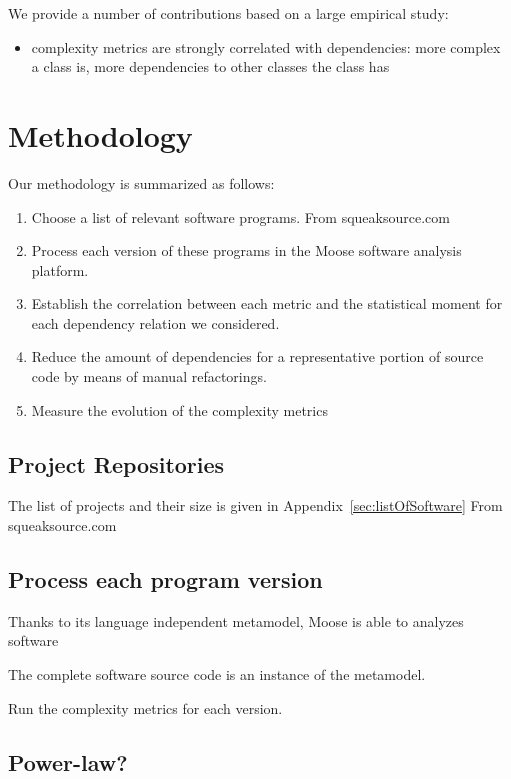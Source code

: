 \documentclass{sig-alternate}
\newcommand{\seclabel}[1]{\label{sec:#1}}
\newcommand{\appref}[1]{Appendix~\ref{sec:#1}}
\begin{document}
We provide a number of contributions based on a large empirical study:
\begin{itemize}
\item complexity metrics are strongly correlated with dependencies: more complex a class is, more dependencies to other classes the class has
\end{itemize}


\section{Methodology}\seclabel{methodology}

Our methodology is summarized as follows:

\begin{enumerate}
\item Choose a list of relevant software programs. From squeaksource.com
\item Process each version of these programs in the Moose software analysis platform. 
\item Establish the correlation between each metric and the statistical moment for each dependency relation we considered.
\item Reduce the amount of dependencies for a representative portion of source code by means of manual refactorings.
\item Measure the evolution of the complexity metrics
\end{enumerate}

\subsection{Project Repositories}

The list of projects and their size is given in \appref{listOfSoftware}
From squeaksource.com


\subsection{Process each program version}

Thanks to its language independent metamodel, Moose is able to analyzes software

The complete software source code is an instance of the metamodel.

Run the complexity metrics for each version.


\subsection{Power-law?}
\end{document}
